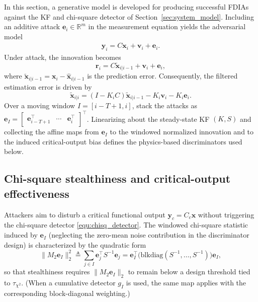 In this section, a generative model is developed for producing successful FDIAs against the KF and chi-square detector of Section~\ref{sec:system_model}. Including an additive attack $\mathbf{e}_i\in\mathbb{R}^m$ in the measurement equation yields the adversarial model
\begin{align}\label{equ:adversarial_measurement_model}
    \mathbf{y}_i = C\mathbf{x}_i+\mathbf{v}_i+\mathbf{e}_i.
\end{align}
Under attack, the innovation becomes
\begin{equation}\label{equ:innovation_attack}
\mathbf{r}_i = C\tilde{\mathbf{x}}_{i|i-1}+\mathbf{v}_i+\mathbf{e}_i,
\end{equation}
where $\tilde{\mathbf{x}}_{i|i-1}=\mathbf{x}_i-\hat{\mathbf{x}}_{i|i-1}$ is the prediction error. Consequently, the filtered estimation error is driven by
\begin{equation}\label{equ:kf_error_attack}
\tilde{\mathbf{x}}_{i|i}
=(I-K_iC)\tilde{\mathbf{x}}_{i|i-1}-K_i\mathbf{v}_i-K_i\mathbf{e}_i.
\end{equation}
Over a moving window $I=[i-T+1,i]$, stack the attacks as $\mathbf{e}_I=\begin{bmatrix}\mathbf{e}_{i-T+1}^{\top}&\cdots&\mathbf{e}_i^{\top}\end{bmatrix}^{\top}$. Linearizing about the steady-state KF $(K,S)$ and collecting the affine maps from $\mathbf{e}_I$ to the windowed normalized innovation and to the induced critical-output bias defines the physics-based discriminators used below.

\subsection{Chi-square stealthiness and critical-output effectiveness}
Attackers aim to disturb a critical functional output $\mathbf{y}_c=C_c\mathbf{x}$ without triggering the chi-square detector \eqref{equ:chisq_detector}. The windowed chi-square statistic induced by $\mathbf{e}_I$ (neglecting the zero-mean noise contribution in the discriminator design) is characterized by the quadratic form
\begin{equation}\label{equ:M2}
\|M_2\mathbf{e}_I\|_2^2
\triangleq
\sum_{j\in I}\mathbf{e}_j^{\top}S^{-1}\mathbf{e}_j
=\mathbf{e}_I^{\top}\big(\mathrm{blkdiag}(S^{-1},\ldots,S^{-1})\big)\mathbf{e}_I,
\end{equation}
so that stealthiness requires $\|M_2\mathbf{e}_I\|_2$ to remain below a design threshold tied to $\tau_{\chi^2}$. (When a cumulative detector $g_I$ is used, the same map applies with the corresponding block-diagonal weighting.)

